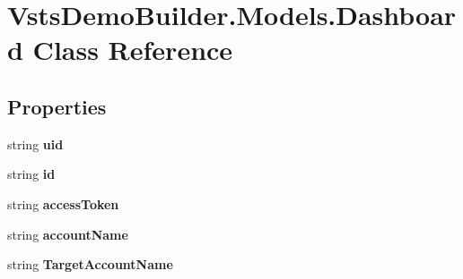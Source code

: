 \hypertarget{class_vsts_demo_builder_1_1_models_1_1_dashboard}{}\section{Vsts\+Demo\+Builder.\+Models.\+Dashboard Class Reference}
\label{class_vsts_demo_builder_1_1_models_1_1_dashboard}
\subsection*{Properties}
\begin{DoxyCompactItemize}
\item 
\mbox{\label{class_vsts_demo_builder_1_1_models_1_1_dashboard_a45f08b7efcf4cb170eab2782339f3930}} 
string {\bfseries uid}
\item 
\mbox{\label{class_vsts_demo_builder_1_1_models_1_1_dashboard_a610e172846abd50f5f5faa1b858561ff}} 
string {\bfseries id}
\item 
\mbox{\label{class_vsts_demo_builder_1_1_models_1_1_dashboard_a91f820032dad2fbee0458f66a6636374}} 
string {\bfseries access\+Token}
\item 
\mbox{\label{class_vsts_demo_builder_1_1_models_1_1_dashboard_a8e01eaa13b64f6ad1b1a92cc9c6574d8}} 
string {\bfseries account\+Name}
\item 
\mbox{\label{class_vsts_demo_builder_1_1_models_1_1_dashboard_aedb01b2a1f0ceeba764b0743f3563ed1}} 
string {\bfseries Target\+Account\+Name}
\item 
\mbox{\label{class_vsts_demo_builder_1_1_models_1_1_dashboard_ae834a3fb5c72e9d2ebb3fbb537f715cd}} 

\end{DoxyCompactItemize}
